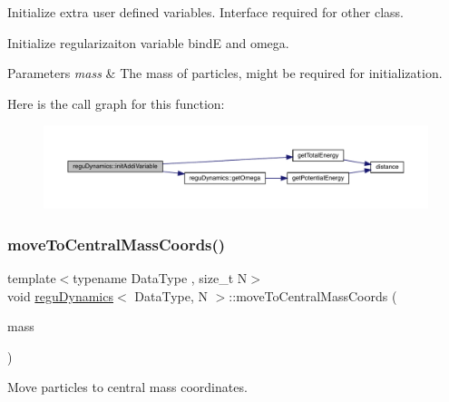 Initialize extra user defined variables. Interface required for other class. 

Initialize regularizaiton variable bindE and omega. 
\begin{DoxyParams}{Parameters}
{\em mass} & The mass of particles, might be required for initialization. \\
\hline
\end{DoxyParams}
Here is the call graph for this function\+:\nopagebreak
\begin{figure}[H]
\begin{center}
\leavevmode
\includegraphics[width=350pt]{classregu_dynamics_aa42158ddf3c5385aa89988b9bb80ff29_cgraph}
\end{center}
\end{figure}
\mbox{\label{classregu_dynamics_adb57f1775922d615b8e506eaf79a1bc0}} 
\subsubsection{\texorpdfstring{move\+To\+Central\+Mass\+Coords()}{moveToCentralMassCoords()}}
{\footnotesize\ttfamily template$<$typename Data\+Type , size\+\_\+t N$>$ \\
void \mbox{\hyperlink{classregu_dynamics}{regu\+Dynamics}}$<$ Data\+Type, N $>$\+::move\+To\+Central\+Mass\+Coords (\begin{DoxyParamCaption}\item[{\mbox{\hyperlink{classregu_dynamics_a34b4b77ea3e49e1cdef584ec8bd281dc}{Scalar\+Array}} \&}]{mass }\end{DoxyParamCaption})\hspace{0.3cm}{\ttfamily [inline]}}



Move particles to central mass coordinates. 

